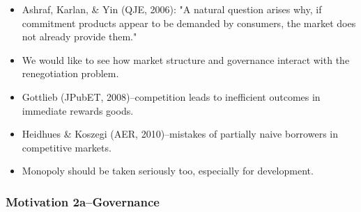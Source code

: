 \documentclass[11pt]{article}%
\begin{document}
\begin{itemize}
\item Ashraf, Karlan, \& Yin (QJE, 2006): "A natural question arises why, if
commitment products appear to be demanded by consumers, the market does not
already provide them."

\item We would like to see how market structure and governance interact with
the renegotiation problem.

\item Gottlieb (JPubET, 2008)--competition leads to inefficient outcomes in
immediate rewards goods.

\item Heidhues \& Koszegi (AER, 2010)--mistakes of partially naive borrowers
in competitive markets.

\item Monopoly should be taken seriously too, especially for development.
\end{itemize}

\frametitle{Motivation 2a--Governance}%
\end{document}
